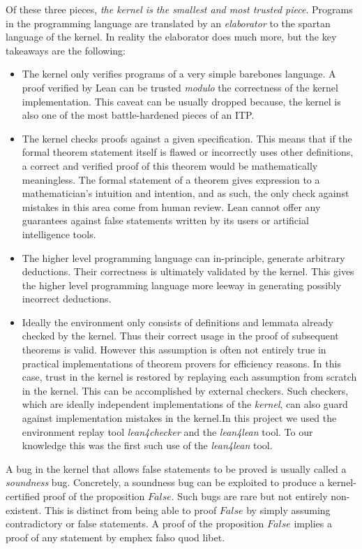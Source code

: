 Of these three pieces, \emph{the kernel is the smallest and most trusted piece}. Programs in the programming language are translated by an \emph{elaborator} to the spartan language of the kernel. In reality the elaborator does much more, but the key takeaways are the following:
\begin{itemize}
    \item The kernel only verifies programs of a very simple barebones language. A proof verified by Lean can be trusted \emph{modulo} the correctness of the kernel implementation. This caveat can be usually dropped because, the kernel is also one of the most battle-hardened pieces of an ITP.
    \item The kernel checks proofs against a given specification. This means that if the formal theorem statement itself is flawed or incorrectly uses other definitions, a correct and verified proof of this theorem would be mathematically meaningless. The formal statement of a theorem gives expression to a mathematician's intuition and intention, and as such, the only check against mistakes in this area come from human review. Lean cannot offer any guarantees against false statements written by its users or artificial intelligence tools.
    \item The higher level programming language can in-principle, generate arbitrary deductions. Their correctness is ultimately validated by the kernel. This gives the higher level programming language more leeway in generating possibly incorrect deductions.
    \item Ideally the environment only consists of definitions and lemmata already checked by the kernel. Thus their correct usage in the proof of subsequent theorems is valid. However this assumption is often not entirely true in practical implementations of theorem provers for efficiency reasons. In this case, trust in the kernel is restored by replaying each assumption from scratch in the kernel. This can be accomplished by external checkers. Such checkers, which are ideally independent implementations of the \emph{kernel}, can also guard against implementation mistakes in the kernel.In this project we used the environment replay tool \textit{lean4checker} and the \textit{lean4lean} \cite{lean4lean} tool. To our knowledge this was the first such use of the \textit{lean4lean} tool.

\end{itemize}

\begin{remark}
    A bug in the kernel that allows false statements to be proved is usually called a \emph{soundness} bug. Concretely, a soundness bug can be exploited to produce a kernel-certified proof of the proposition $False$. Such bugs are rare but not entirely non-existent. This is distinct from being able to proof $False$ by simply assuming contradictory or false statements. A proof of the proposition $False$ implies a proof of any statement by emph{ex falso quod libet}.
\end{remark}

